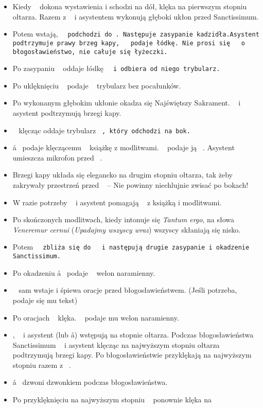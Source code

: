 \begin{itemize}
	\item  Kiedy \ii~ dokona wystawienia i schodzi na dół, klęka na pierwszym
	      stopniu ołtarza. Razem z \cc~ i asystentem wykonują głęboki ukłon
	      przed Sanctissimum.
	\item Potem wstają, \tt~ podchodzi do \cc. Następuje zasypanie
	      kadzidła.Asystent podtrzymuje prawy brzeg kapy, \cc~ podaje łódkę. Nie
	      prosi się \ii~ o błogosławieństwo, nie całuje się łyżeczki.
	\item  Po zasypaniu \cc~ oddaje łódkę \tt~ i odbiera od niego trybularz.
	\item Po uklęknięciu \cc~ podaje \ii~ trybularz bez pocałunków.
	\item Po wykonanym głębokim ukłonie okadza się Najświętszy Sakrament. \cc~ i
	      asystent podtrzymują brzegi kapy.
	\item \cc~ klęcząc oddaje trybularz \tt~, który odchodzi na bok.
	\item \aa~ podaje klęczącemu \cc~ książkę z modlitwami. \cc~ podaje ją \ii~.
	      Asystent umieszcza mikrofon przed \ii~.
	\item Brzegi kapy układa się elegancko na drugim stopniu ołtarza, tak żeby
	      zakrywały przestrzeń przed \ii~ – Nie powinny niechlujnie zwisać po
	      bokach!
	\item W razie potrzeby \cc~ i asystent pomagają \ii~ z książką i modlitwami.
	\item Po skończonych modlitwach, kiedy intonuje się \textit{Tantum ergo}, na
	      słowa \textit{Veneremur cernui} (\textit{Upadajmy wszyscy wraz})
	      wszyscy skłaniają się nisko.
	\item Potem \tt~ zbliża się do \cc~ i następują drugie zasypanie i
	      okadzenie Sanctissimum.
	\item Po okadzeniu \aa~ podaje \cc~ welon naramienny.
	\item \ii~ sam wstaje i śpiewa oracje przed błogosławieństwem. (Jeśli
	      potrzeba, podaje się mu tekst)
	\item  Po oracjach \ii~ klęka. \cc~ podaje mu welon naramienny.
	\item \ii, \cc~ i asystent (lub \aa) wstępują na stopnie ołtarza. Podczas
	      błogosławieństwa Sanctissimum \cc~ i asystent klęcząc na najwyższym
	      stopniu ołtarza podtrzymują brzegi kapy. Po błogosławieństwie
	      przyklękają na najwyższym stopniu razem z \ii~.
	\item \aa~ dzwoni dzwonkiem podczas błogosławieństwa.
	\item Po przyklęknięciu na najwyższym stopniu \ii~ ponownie klęka na

\end{itemize}
